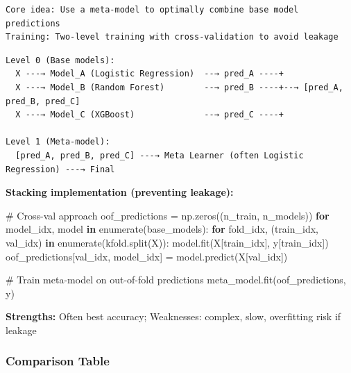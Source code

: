 \documentclass[11pt]{article}
\newenvironment{Shaded}{\begin{snugshade}}{\end{snugshade}}
\newcommand{\BuiltInTok}[1]{\textcolor[rgb]{0.50,0.55,0.55}{#1}}
\newcommand{\CommentTok}[1]{\textcolor[rgb]{0.48,0.49,0.49}{#1}}
\newcommand{\ControlFlowTok}[1]{\textcolor[rgb]{0.99,0.74,0.29}{\textbf{#1}}}
\newcommand{\KeywordTok}[1]{\textcolor[rgb]{0.81,0.81,0.76}{\textbf{#1}}}
\newcommand{\NormalTok}[1]{\textcolor[rgb]{0.81,0.81,0.76}{#1}}
\newcommand{\OperatorTok}[1]{\textcolor[rgb]{0.81,0.81,0.76}{#1}}
\begin{document}
\setcodelang{}

\begin{verbatim}
Core idea: Use a meta-model to optimally combine base model predictions
Training: Two-level training with cross-validation to avoid leakage
\end{verbatim}

\setcodelang{}

\begin{verbatim}
Level 0 (Base models):
  X ---→ Model_A (Logistic Regression)  --→ pred_A ----+
  X ---→ Model_B (Random Forest)        --→ pred_B ----+--→ [pred_A, pred_B, pred_C]
  X ---→ Model_C (XGBoost)              --→ pred_C ----+

Level 1 (Meta-model):
  [pred_A, pred_B, pred_C] ---→ Meta Learner (often Logistic Regression) ---→ Final
\end{verbatim}

\textbf{Stacking implementation (preventing leakage):}


\begin{Shaded}
\begin{Highlighting}[]
\CommentTok{\# Cross{-}val approach}
\NormalTok{oof\_predictions }\OperatorTok{=}\NormalTok{ np.zeros((n\_train, n\_models))}
\ControlFlowTok{for}\NormalTok{ model\_idx, model }\KeywordTok{in} \BuiltInTok{enumerate}\NormalTok{(base\_models):}
    \ControlFlowTok{for}\NormalTok{ fold\_idx, (train\_idx, val\_idx) }\KeywordTok{in} \BuiltInTok{enumerate}\NormalTok{(kfold.split(X)):}
\NormalTok{        model.fit(X[train\_idx], y[train\_idx])}
\NormalTok{        oof\_predictions[val\_idx, model\_idx] }\OperatorTok{=}\NormalTok{ model.predict(X[val\_idx])}

\CommentTok{\# Train meta{-}model on out{-}of{-}fold predictions}
\NormalTok{meta\_model.fit(oof\_predictions, y)}
\end{Highlighting}
\end{Shaded}

\textbf{Strengths:} Often best accuracy; Weaknesses: complex, slow, overfitting risk if leakage

\subsubsection{Comparison Table}\label{comparison-table-1}
\end{document}
